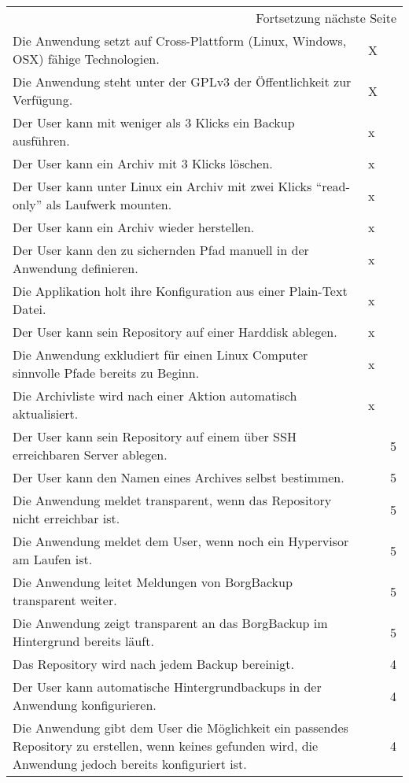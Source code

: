 \begin{longtable}{|p{9cm}|p{1.5cm}|p{2cm}|}
\hline
\endhead
\hline\multicolumn{3}{r}{Fortsetzung nächste Seite} \\
\endfoot
\endlastfoot
\hline
Die Anwendung setzt auf Cross-Plattform (Linux, Windows, OSX) fähige Technologien. & X & \\
\hline
Die Anwendung steht unter der GPLv3 der Öffentlichkeit zur Verfügung. & X & \\
\hline
Der User kann mit weniger als 3 Klicks ein Backup ausführen. & x & \\
\hline
Der User kann ein Archiv mit 3 Klicks löschen. & x & \\
\hline
Der User kann unter Linux ein Archiv mit zwei Klicks "`read-only"' als Laufwerk mounten. & x & \\
\hline
Der User kann ein Archiv wieder herstellen. & x & \\
\hline
Der User kann den zu sichernden Pfad manuell in der Anwendung definieren. & x & \\
\hline
Die Applikation holt ihre Konfiguration aus einer Plain-Text Datei. & x & \\
\hline
Der User kann sein Repository auf einer Harddisk ablegen. & x & \\
\hline
Die Anwendung exkludiert für einen Linux Computer sinnvolle Pfade bereits zu Beginn. & x & \\
\hline
Die Archivliste wird nach einer Aktion automatisch aktualisiert. & x & \\
\hline
Der User kann sein Repository auf einem über SSH erreichbaren Server ablegen. &  & 5\\
\hline
Der User kann den Namen eines Archives selbst bestimmen. &  & 5\\
\hline
Die Anwendung meldet transparent, wenn das Repository nicht erreichbar ist. &  & 5\\
\hline
Die Anwendung meldet dem User, wenn noch ein Hypervisor am Laufen ist. &  & 5\\
\hline
Die Anwendung leitet Meldungen von BorgBackup transparent weiter. &  & 5\\
\hline
Die Anwendung zeigt transparent an das BorgBackup im Hintergrund bereits läuft. &  & 5\\
\hline
Das Repository wird nach jedem Backup bereinigt. &  & 4\\
\hline
Der User kann automatische Hintergrundbackups in der Anwendung konfigurieren. &  & 4\\
\hline
Die Anwendung gibt dem User die Möglichkeit ein passendes Repository zu erstellen, wenn keines gefunden wird, die Anwendung jedoch bereits konfiguriert ist. &  & 4\\

\end{longtable}
